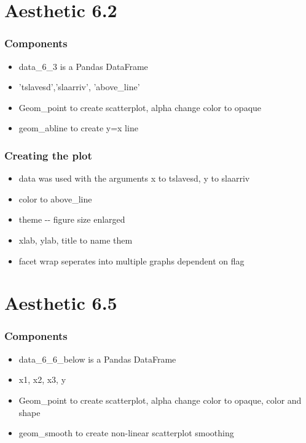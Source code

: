 \documentclass[11pt]{article}
\providecommand{\tightlist}{%
      \setlength{\itemsep}{0pt}\setlength{\parskip}{0pt}}
\begin{document}
\section{Aesthetic 6.2}\label{aesthetic-6.2}

\subsubsection{Components}\label{components-1}

\begin{itemize}
\tightlist
\item
  data\_6\_3 is a Pandas DataFrame
\item
  'tslavesd','slaarriv', 'above\_line'
\item
  Geom\_point to create scatterplot, alpha change color to opaque
\item
  geom\_abline to create y=x line
\end{itemize}

\subsubsection{Creating the plot}\label{creating-the-plot-1}

\begin{itemize}
\tightlist
\item
  data was used with the arguments x to tslavesd, y to slaarriv
\item
  color to above\_line
\item
  theme -\/- figure size enlarged
\item
  xlab, ylab, title to name them
\item
  facet wrap seperates into multiple graphs dependent on flag
\end{itemize}

\section{Aesthetic 6.5}\label{aesthetic-6.5}

\subsubsection{Components}\label{components-2}

\begin{itemize}
\tightlist
\item
  data\_6\_6\_below is a Pandas DataFrame
\item
  x1, x2, x3, y
\item
  Geom\_point to create scatterplot, alpha change color to opaque, color
  and shape
\item
  geom\_smooth to create non-linear scatterplot smoothing
\end{itemize}
\end{document}
